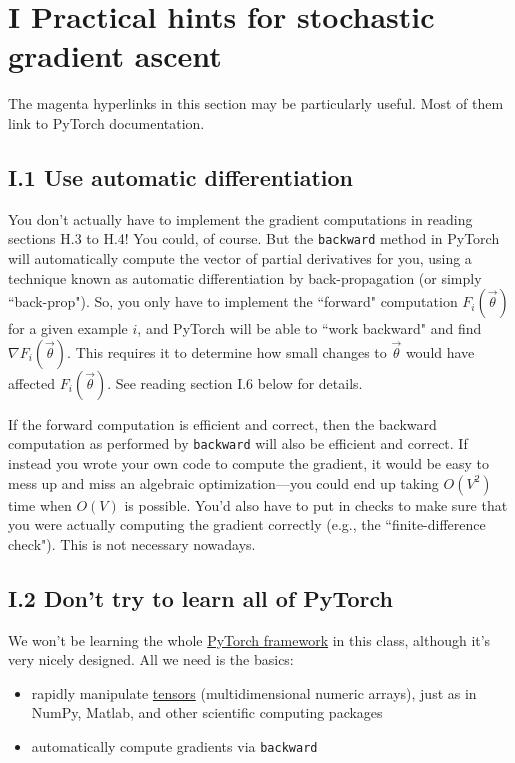 \section*{ I Practical hints for stochastic gradient ascent}

The magenta hyperlinks in this section may be particularly useful. Most of them link to PyTorch documentation.

\subsection*{I.1 Use automatic differentiation}

You don’t actually have to implement the gradient computations in reading sections H.3 to H.4! You could, of course. But the \texttt{backward} method in PyTorch will automatically compute the vector of partial derivatives for you, using a technique known as automatic differentiation by back-propagation (or simply ``back-prop"). So, you only have to implement the ``forward" computation $F_i(\vec{\theta})$ for a given example $i$, and PyTorch will be able to ``work backward" and find $\nabla F_i(\vec{\theta})$. This requires it to determine how small changes to $\vec{\theta}$ would have affected $F_i(\vec{\theta})$. See reading section I.6 below for details.

If the forward computation is efficient and correct, then the backward computation as performed by \texttt{backward} will also be efficient and correct. If instead you wrote your own code to compute the gradient, it would be easy to mess up and miss an algebraic optimization—you could end up taking $O(V^2)$ time when $O(V)$ is possible. You’d also have to put in checks to make sure that you were actually computing the gradient correctly (e.g., the ``finite-difference check"). This is not necessary nowadays.

\subsection*{I.2 Don’t try to learn all of PyTorch}

We won’t be learning the whole \href{https://pytorch.org}{PyTorch framework} in this class, although it’s very nicely designed. All we need is the basics:
\begin{itemize}
    \item rapidly manipulate \href{https://pytorch.org/docs/stable/tensors.html}{tensors} (multidimensional numeric arrays), just as in NumPy, Matlab, and other scientific computing packages
    \item automatically compute gradients via \texttt{backward}
\end{itemize}

